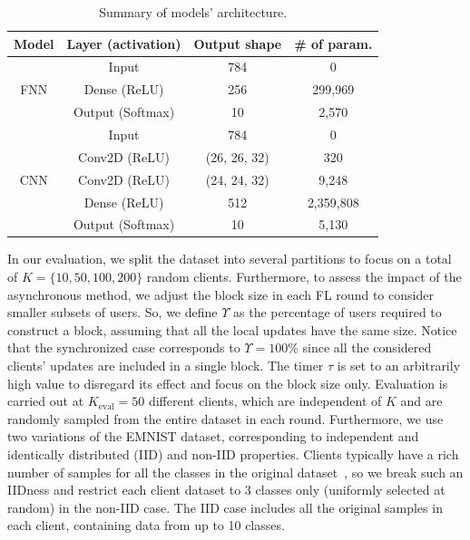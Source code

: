 \documentclass[lettersize,journal]{IEEEtran}
\begin{document}
\begin{table}[ht!]
\caption{Summary of models' architecture.}
\label{tbl:model_details}
\begin{tabular}{|c|c|c|c|}
\hline
\textbf{Model} & \multicolumn{1}{c|}{\textbf{Layer (activation)}} & \textbf{Output shape} & \textbf{\# of param.} \\ \hline
\multirow{3}{*}{FNN} & Input & 784 & 0 \\ \cline{2-4} 
 & Dense (ReLU) & 256 & 299,969 \\ \cline{2-4} 
 & Output (Softmax) & 10 & 2,570 \\ \hline
\multirow{5}{*}{CNN} & Input & 784 & 0 \\ \cline{2-4} 
 & Conv2D (ReLU) & (26, 26, 32) & 320 \\ \cline{2-4} 
 & Conv2D (ReLU) & (24, 24, 32) & 9,248 \\ \cline{2-4} 
 & Dense (ReLU) & 512 & 2,359,808 \\ \cline{2-4} 
 & Output (Softmax) & 10 & 5,130 \\ \hline
\end{tabular}
\end{table}

In our evaluation, we split the dataset into several partitions to focus on a total of $K=\{10, 50, 100, 200\}$ random clients. Furthermore, to assess the impact of the asynchronous method, we adjust the block size in each FL round to consider smaller subsets of users. So, we define $\Upsilon$ as the percentage of users required to construct a block, assuming that all the local updates have the same size. Notice that the synchronized case corresponds to $\Upsilon=100\%$ since all the considered clients' updates are included in a single block. The timer $\tau$ is set to an arbitrarily high value to disregard its effect and focus on the block size only. Evaluation is carried out at $K_\text{eval} = 50$ different clients, which are independent of $K$ and are randomly sampled from the entire dataset in each round. Furthermore, we use two variations of the EMNIST dataset, corresponding to independent and identically distributed (IID) and non-IID properties. Clients typically have a rich number of samples for all the classes in the original dataset~\cite{lu2020blockchain}, so we break such an IIDness and restrict each client dataset to 3 classes only (uniformly selected at random) in the non-IID case. The IID case includes all the original samples in each client, containing data from up to 10 classes.
\end{document}
